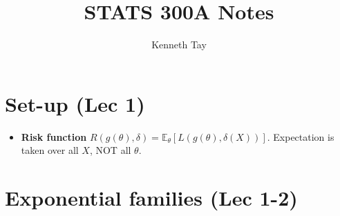 \documentclass[twoside]{article}
\newcommand\bbE{\mathbb{E}}
\newcommand\dlt{\delta}
\def\t{\theta}
\begin{document}
\title{STATS 300A Notes}
\author{Kenneth Tay}
\date{\vspace{-3ex}}
\maketitle

\section*{Set-up (Lec 1)}
\begin{itemize}
\item \textbf{Risk function} $R(g(\t), \dlt) = \bbE_\t [L(g(\t), \dlt(X))]$. Expectation is taken over all $X$, NOT all $\t$.
\end{itemize}

\section*{Exponential families (Lec 1-2)}
\end{document}
